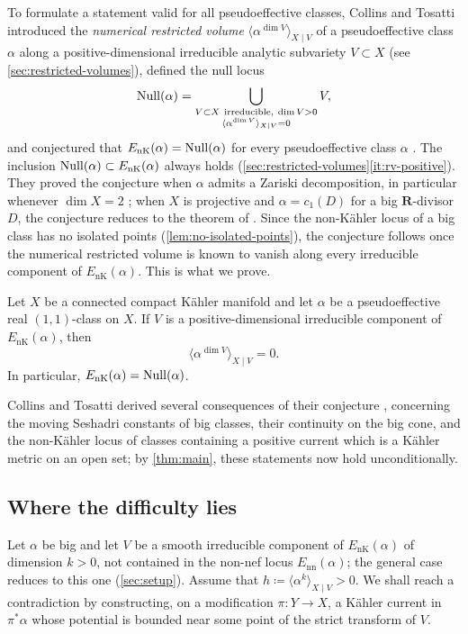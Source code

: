 \documentclass[11pt,a4paper]{amsart}
\newcommand{\EnK}{E_{\mathrm{nK}}}
\newcommand{\Enn}{E_{\mathrm{nn}}}
\theoremstyle{definition}
\begin{document}
To formulate a statement valid for all pseudoeffective classes,
Collins and Tosatti \cite{CT22} introduced the \emph{numerical restricted
volume}
$\langle\alpha^{\dim V}\rangle_{X\mid V}$ of a pseudoeffective class
$\alpha$ along a positive-dimensional irreducible analytic subvariety
$V\subset X$ (see \cref{sec:restricted-volumes}), defined the null locus
\begin{equation}\label{eq:null-locus}
  \operatorname{Null}(\alpha)
  =\bigcup_{\substack{V\subset X\ \text{irreducible},\ \dim V>0\\
      \langle\alpha^{\dim V}\rangle_{X\mid V}=0}}V,
\end{equation}
and conjectured that $\EnK(\alpha)=\Null(\alpha)$ for every pseudoeffective
class $\alpha$ \cite[Conjecture~1.1]{CT22}. The inclusion
$\Null(\alpha)\subset\EnK(\alpha)$ always holds
(\cref{sec:restricted-volumes}\ref{it:rv-positive}). They proved the conjecture
when $\alpha$ admits a Zariski decomposition, in particular whenever
$\dim X=2$ \cite[Theorem~1.2]{CT22}; when $X$ is projective and
$\alpha=c_1(D)$ for a big $\mathbf R$-divisor $D$, the conjecture reduces
to the theorem of \cite{ELMNP09} \cite[Proposition~1.4]{CT22}. Since the
non-K\"ahler locus of a big class has no isolated points
(\cref{lem:no-isolated-points}), the conjecture follows once the
numerical restricted volume is known to vanish along every irreducible
component of $\EnK(\alpha)$. This is what we prove.

\begin{samepage}
\begin{maintheorem}\label{thm:main}
Let $X$ be a connected compact K\"ahler manifold and let $\alpha$ be a
pseudoeffective real $(1,1)$-class on $X$. If $V$ is a
positive-dimensional irreducible component of $\EnK(\alpha)$, then
\[
  \langle\alpha^{\dim V}\rangle_{X\mid V}=0.
\]
In particular, $\EnK(\alpha)=\Null(\alpha)$.
\end{maintheorem}
\end{samepage}

Collins and Tosatti derived several consequences of their conjecture
\cite[Theorems~1.6, 1.7 and~1.8]{CT22}, concerning the moving Seshadri
constants of big classes, their continuity on the big cone, and the
non-K\"ahler locus of classes containing a positive current which is a
K\"ahler metric on an open set; by \cref{thm:main}, these statements now
hold unconditionally.

\subsection*{Where the difficulty lies}
Let $\alpha$ be big and let $V$ be a smooth irreducible component of
$\EnK(\alpha)$ of dimension $k>0$, not contained in the non-nef locus
$\Enn(\alpha)$; the general case reduces to this one
(\cref{sec:setup}). Assume that
$h\coloneqq\langle\alpha^k\rangle_{X\mid V}>0$. We shall reach a
contradiction by constructing, on a modification $\pi\colon Y\to X$, a
K\"ahler current in $\pi^*\alpha$ whose potential is bounded near some point
of the strict transform of $V$.
\end{document}
